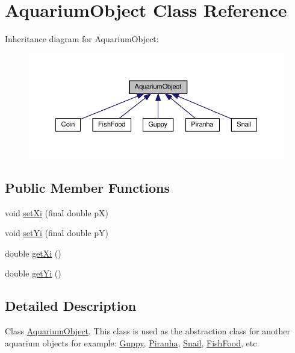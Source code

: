 \hypertarget{class_aquarium_object}{}\section{Aquarium\+Object Class Reference}
\label{class_aquarium_object}


Inheritance diagram for Aquarium\+Object\+:
\nopagebreak
\begin{figure}[H]
\begin{center}
\leavevmode
\includegraphics[width=350pt]{class_aquarium_object__inherit__graph}
\end{center}
\end{figure}
\subsection*{Public Member Functions}
\begin{DoxyCompactItemize}
\item 
void \mbox{\hyperlink{class_aquarium_object_a5ab79d2c1c8eb52e0857b734803a7385}{set\+Xi}} (final double pX)
\item 
void \mbox{\hyperlink{class_aquarium_object_a9bd7deefac91c170bcdc15c823184193}{set\+Yi}} (final double pY)
\item 
double \mbox{\hyperlink{class_aquarium_object_a020f612b6195b3332a4bb602f9f098be}{get\+Xi}} ()
\item 
double \mbox{\hyperlink{class_aquarium_object_acc1d2d6ed24f6802eaded313d25785a8}{get\+Yi}} ()
\end{DoxyCompactItemize}


\subsection{Detailed Description}
Class \mbox{\hyperlink{class_aquarium_object}{Aquarium\+Object}}. This class is used as the abstraction class for another aquarium objects for example\+: \mbox{\hyperlink{class_guppy}{Guppy}}, \mbox{\hyperlink{class_piranha}{Piranha}}, \mbox{\hyperlink{class_snail}{Snail}}, \mbox{\hyperlink{class_fish_food}{Fish\+Food}}, etc 

